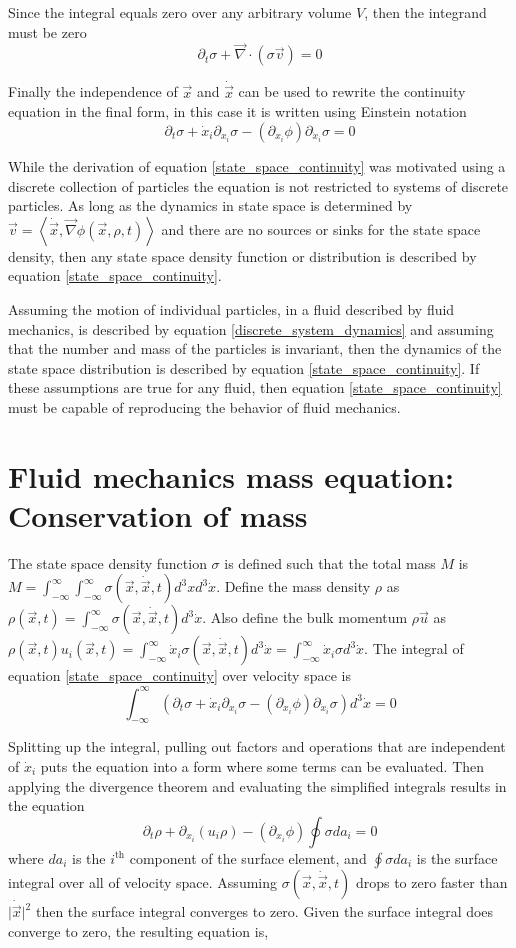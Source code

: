 \documentclass[%
 twocolumn,
 amsmath,amssymb,
 aps,
]{revtex4-1}
\newcommand{\dvec}[1]{\dot{\vec{#1}}}
\newcommand{\grad}{\vec{\nabla}}
\newcommand{\intVdot}[1]{\int_{-\infty}^{\infty} #1 d^3\dot{x}}
\newcommand{\intVVdot}[1]{\int_{-\infty}^{\infty}\int_{-\infty}^{\infty} #1 d^3xd^3\dot{x}}
\begin{document}
Since the integral equals zero over any arbitrary volume $V$, then the integrand must be zero
\[
\partial_t \sigma + \grad\cdot\left(\sigma\vec{v}\right)=0
\]

Finally the independence of $\vec{x}$ and $\dvec{x}$ can be used to rewrite the continuity equation in the final form, in this case it is written using Einstein notation
\begin{equation}
\partial_t \sigma + \dot{x}_i\partial_{x_i}\sigma-\left(\partial_{x_i}\phi\right)\partial_{\dot{x}_i}\sigma=0
\label{state_space_continuity}
\end{equation}

While the derivation of equation \eqref{state_space_continuity} was motivated using a discrete collection of particles the equation is not restricted to systems of discrete particles. As long as the dynamics in state space is determined by $\vec{v}=\left\langle\dvec{x}, \grad\phi(\vec{x}, \rho, t)\right\rangle$ and there are no sources or sinks for the state space density, then any state space density function or distribution is described by equation \eqref{state_space_continuity}.

Assuming the motion of individual particles, in a fluid described by fluid mechanics, is described by equation \eqref{discrete_system_dynamics} and assuming that the number and mass of the particles is invariant, then the dynamics of the state space distribution is described by equation \eqref{state_space_continuity}. If these assumptions are true for any fluid, then equation \eqref{state_space_continuity} must be capable of reproducing the behavior of fluid mechanics.

\section{Fluid mechanics mass equation: Conservation of mass}
The state space density function $\sigma$ is defined such that the total mass $M$ is $M=\intVVdot{\sigma(\vec{x}, \dvec{x}, t)}$. Define the mass density $\rho$ as $\rho(\vec{x}, t)=\intVdot{\sigma(\vec{x}, \dvec{x}, t)}$. Also define the bulk momentum $\rho\vec{u}$ as $\rho(\vec{x}, t) u_i(\vec{x}, t)=\intVdot{\dot{x}_i\sigma(\vec{x}, \dvec{x}, t)}=\intVdot{\dot{x}_i\sigma}$. The integral of equation \eqref{state_space_continuity} over velocity space is
\[
\intVdot{\left(\partial_t \sigma + \dot{x}_i\partial_{x_i}\sigma-\left(\partial_{x_i}\phi\right)\partial_{\dot{x}_i}\sigma\right)}=0
\]

Splitting up the integral, pulling out factors and operations that are independent of $\dot{x}_i$ puts the equation into a form where some terms can be evaluated. Then applying the divergence theorem and evaluating the simplified integrals results in the equation
\[
\partial_t\rho + \partial_{x_i}\left(u_i\rho\right)-\left(\partial_{x_i}\phi\right)\oint{\sigma da_i}=0
\]
where $da_i$ is the $i^{\text{th}}$ component of the surface element, and $\oint{\sigma da_i}$ is the surface integral over all of velocity space. Assuming $\sigma(\vec{x}, \dvec{x}, t)$ drops to zero faster than $\lvert\dvec{x}\rvert^2$ then the surface integral converges to zero. Given the surface integral does converge to zero, the resulting equation is, 
\end{document}
